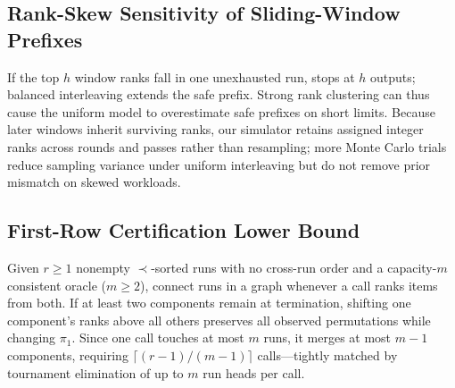 \subsection{Rank-Skew Sensitivity of Sliding-Window Prefixes}
\label{app:cost-skew}

If the top $h$ window ranks fall in one unexhausted run, \SW{} stops at $h$ outputs; balanced interleaving extends the safe prefix. Strong rank clustering can thus cause the uniform model to overestimate safe prefixes on short limits. Because later windows inherit surviving ranks, our simulator retains assigned integer ranks across rounds and passes rather than resampling; more Monte Carlo trials reduce sampling variance under uniform interleaving but do not remove prior mismatch on skewed workloads.

\subsection{First-Row Certification Lower Bound}
\label{app:cost-lowerbound}

Given $r \ge 1$ nonempty $\prec$-sorted runs with no cross-run order and a capacity-$m$ consistent oracle ($m \ge 2$), connect runs in a graph whenever a call ranks items from both. If at least two components remain at termination, shifting one component's ranks above all others preserves all observed permutations while changing $\pi_1$. Since one call touches at most $m$ runs, it merges at most $m - 1$ components, requiring $\lceil (r - 1) / (m - 1) \rceil$ calls—tightly matched by tournament elimination of up to $m$ run heads per call.
